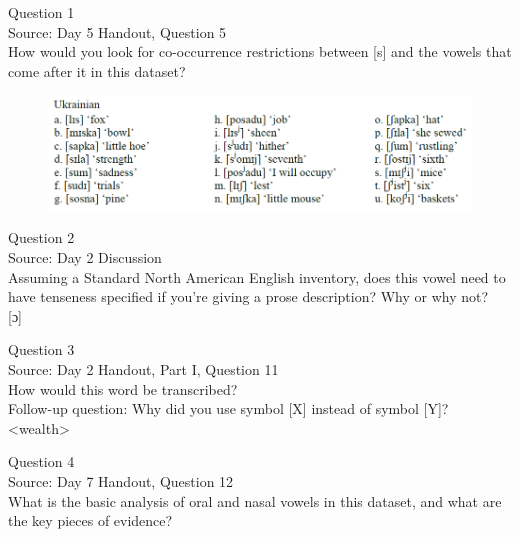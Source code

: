 \documentclass[12pt]{article}
\begin{document}
{\large Question 1}\\

Source: Day 5 Handout, Question 5\\

How would you look for co-occurrence restrictions between [s] and the vowels that come after it in this dataset?\\

\begin{figure}[H]
\includegraphics{../images/ukrainian.png}
\end{figure}

\newpage

{\large Question 2}\\

Source: Day 2 Discussion\\

Assuming a Standard North American English inventory, does this vowel need to have tenseness specified if you're giving a prose description? Why or why not?\\

{[ɔ]}


\newpage

{\large Question 3}\\

Source: Day 2 Handout, Part I, Question 11\\

How would this word be transcribed?\\ Follow-up question: Why did you use symbol [X] instead of symbol [Y]?\\

<wealth>


\newpage

{\large Question 4}\\

Source: Day 7 Handout, Question 12\\

What is the basic analysis of oral and nasal vowels in this dataset, and what are the key pieces of evidence?\\
\end{document}
